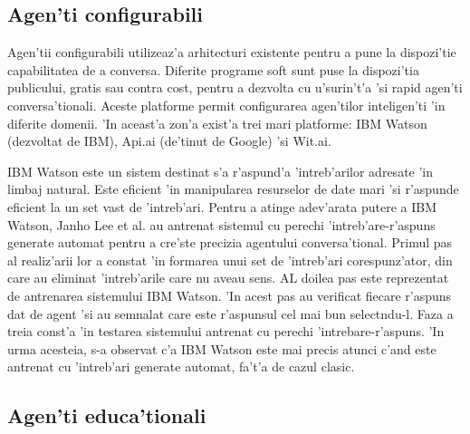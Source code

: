 \documentclass[12pt,a4paper,twoside]{report}
\begin{document}

\subsection{Agen'ti configurabili}

Agen'tii configurabili utilizeaz'a arhitecturi existente pentru a pune la dispozi'tie capabilitatea de a conversa. 
Diferite programe soft sunt puse la dispozi'tia publicului, gratis sau contra cost, pentru a dezvolta cu u'surin't'a 'si rapid agen'ti conversa'tionali. Aceste platforme permit configurarea agen'tilor inteligen'ti 'in diferite domenii. 'In aceast'a zon'a exist'a trei mari platforme: IBM Watson (dezvoltat de IBM), Api.ai (de'tinut de Google) 'si Wit.ai. 


IBM Watson este un sistem destinat s'a r'aspund'a 'intreb'arilor adresate 'in limbaj natural. Este eficient 'in manipularea resurselor de date mari 'si r'aspunde eficient la un set vast de 'intreb'ari. Pentru a atinge adev'arata putere a IBM Watson, Janho Lee et al. \cite{LeeTrainingPairs} au antrenat sistemul cu perechi 'intreb'are-r'aspuns generate automat pentru a cre'ste precizia agentului conversa'tional. Primul pas al realiz'arii lor a constat 'in formarea unui set de 'intreb'ari corespunz'ator, din care au eliminat 'intreb'arile care nu aveau sens. AL doilea pas este reprezentat de antrenarea sistemului IBM Watson. 'In acest pas au verificat fiecare r'aspuns dat de agent 'si au semnalat care este r'aspunsul cel mai bun select\ia ndu-l. Faza a treia const'a 'in testarea sistemului antrenat cu perechi 'intrebare-r'aspuns. 'In urma acesteia, s-a observat c'a IBM Watson este mai precis atunci c'and este antrenat cu 'intreb'ari generate automat, fa't'a de cazul clasic.


\subsection{Agen'ti educa'tionali}
\end{document}
